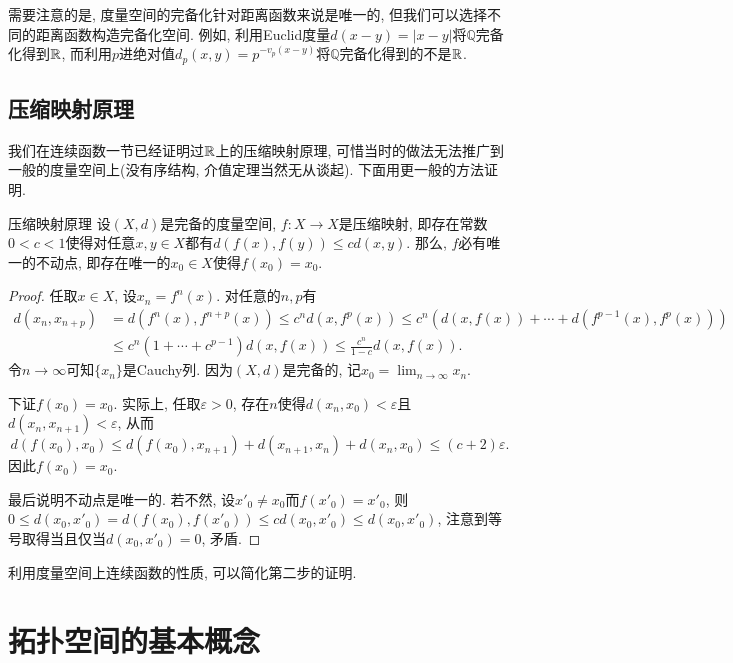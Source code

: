需要注意的是, 度量空间的完备化针对距离函数来说是唯一的, 但我们可以选择不同的距离函数构造完备化空间. 例如, 利用Euclid度量$d(x-y)=|x-y|$将$\mathbb{Q}$完备化得到$\mathbb{R}$, 而利用$p$进绝对值$d_p(x,y) = p^{-v_p(x-y)}$将$\mathbb{Q}$完备化得到的不是$\mathbb{R}$. 

\subsection{压缩映射原理}

我们在连续函数一节已经证明过$\mathbb{R}$上的压缩映射原理, 可惜当时的做法无法推广到一般的度量空间上(没有序结构, 介值定理当然无从谈起). 下面用更一般的方法证明. 

\begin{theorem}{压缩映射原理}
	设$(X,d)$是完备的度量空间, $f:X \to X$是压缩映射, 即存在常数$0 < c < 1$使得对任意$x,y \in X$都有$d(f(x),f(y)) \leq cd(x,y)$. 那么, $f$必有唯一的不动点, 即存在唯一的$x_0 \in X$使得$f(x_0)=x_0$. 
\end{theorem}
\begin{proof}
	任取$x \in X$, 设$x_n=f^n(x)$. 对任意的$n,p$有
	\begin{align*}
		d(x_n,x_{n+p}) &= d(f^n(x),f^{n+p}(x)) \leq c^nd(x,f^p(x)) \leq c^n( d(x,f(x))+\cdots + d(f^{p-1}(x),f^p(x)) ) \\
		&\leq c^n(1+\cdots + c^{p-1}) d(x,f(x)) \leq \frac{c^n}{1-c} d(x,f(x)). 
	\end{align*}
	令$n\to \infty$可知$\{ x_n \}$是Cauchy列. 因为$(X,d)$是完备的, 记$x_0 = \lim_{n\to \infty} x_n$. 
	
	下证$f(x_0)=x_0$. 实际上, 任取$\varepsilon >0$, 存在$n$使得$d(x_n,x_0)<\varepsilon$且$d(x_n,x_{n+1})<\varepsilon$, 从而$$d(f(x_0),x_0) \leq d(f(x_0),x_{n+1}) + d(x_{n+1},x_n) + d(x_n,x_0) \leq (c+2)\varepsilon .$$
	因此$f(x_0)=x_0$. 
	
	最后说明不动点是唯一的. 若不然, 设$x'_0 \neq x_0$而$f(x'_0)=x'_0$, 则$0 \leq d(x_0,x'_0) = d(f(x_0),f(x'_0)) \leq cd(x_0,x'_0) \leq d(x_0,x'_0)$, 注意到等号取得当且仅当$d(x_0,x'_0)=0$, 矛盾. 
\end{proof}
\begin{remark}
	利用度量空间上连续函数的性质, 可以简化第二步的证明. 
\end{remark}




\newpage
\section{拓扑空间的基本概念}

